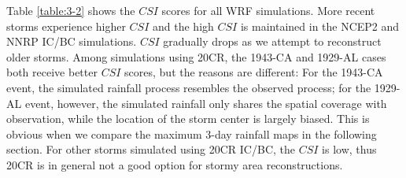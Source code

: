 Table \ref{table:3-2} shows the $CSI$ scores for all WRF simulations. More recent storms experience higher $CSI$ and the high $CSI$ is maintained in the NCEP2 and NNRP IC/BC simulations. $CSI$ gradually drops as we attempt to reconstruct older storms. Among simulations using 20CR, the 1943-CA and 1929-AL cases both receive better $CSI$ scores, but the reasons are different: For the 1943-CA event, the simulated rainfall process resembles the observed process; for the 1929-AL event, however, the simulated rainfall only shares the spatial coverage with observation, while the location of the storm center is largely biased. This is obvious when we compare the maximum 3-day rainfall maps in the following section. For other storms simulated using 20CR IC/BC, the $CSI$ is low, thus 20CR is in general not a good option for stormy area reconstructions.

